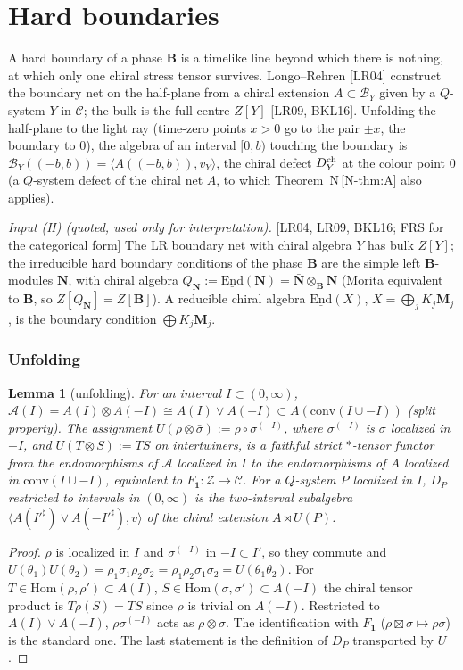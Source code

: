 \documentclass[11pt]{article}
\newtheorem{lemma}[theorem]{Lemma}
\theoremstyle{definition}
\theoremstyle{remark}
\newcommand{\cA}{\mathcal A}
\newcommand{\cB}{\mathcal B}
\newcommand{\bfB}{\mathbf B}
\newcommand{\nref}[1]{N\,\ref{N-#1}}
\begin{document}
\section{Hard boundaries}\label{sec:hard}
A hard boundary of a phase $\bfB$ is a timelike line beyond which there is nothing, at which only one chiral stress tensor survives. Longo--Rehren [LR04] construct the boundary net on the half-plane from a chiral extension $A\subset\cB_Y$ given by a $Q$-system $Y$ in $\mathcal C$; the bulk is the full centre $Z[Y]$ [LR09, BKL16]. Unfolding the half-plane to the light ray (time-zero points $x>0$ go to the pair $\pm x$, the boundary to $0$), the algebra of an interval $[0,b)$ touching the boundary is $\cB_Y((-b,b))=\langle A((-b,b)),v_Y\rangle$, the chiral defect $D^{\rm ch}_Y$ at the colour point $0$ (a $Q$-system defect of the chiral net $A$, to which Theorem~\nref{thm:A} also applies).

\emph{Input (H) (quoted, used only for interpretation).} [LR04, LR09, BKL16; FRS for the categorical form] The LR boundary net with chiral algebra $Y$ has bulk $Z[Y]$; the irreducible hard boundary conditions of the phase $\bfB$ are the simple left $\bfB$-modules $\mathbf N$, with chiral algebra $Q_{\mathbf N}:=\underline{\mathrm{End}}(\mathbf N)=\bar{\mathbf N}\otimes_{\bfB}\mathbf N$ (Morita equivalent to $\bfB$, so $Z[Q_{\mathbf N}]=Z[\bfB]$). A reducible chiral algebra $\underline{\mathrm{End}}(X)$, $X=\bigoplus_jK_j\mathbf M_j$, is the boundary condition $\bigoplus K_j\mathbf M_j$.

\subsubsection*{Unfolding}
\begin{lemma}[unfolding]\label{lem:unfold}
For an interval $I\subset(0,\infty)$, $\cA(I)=A(I)\otimes A(-I)\cong A(I)\vee A(-I)\subset A(\mathrm{conv}(I\cup-I))$ (split property). The assignment $U(\rho\otimes\bar\sigma):=\rho\circ\sigma^{(-I)}$, where $\sigma^{(-I)}$ is $\sigma$ localized in $-I$, and $U(T\otimes S):=TS$ on intertwiners, is a faithful strict $*$-tensor functor from the endomorphisms of $\cA$ localized in $I$ to the endomorphisms of $A$ localized in $\mathrm{conv}(I\cup-I)$, equivalent to $F_{\mathbf 1}\colon\mathcal Z\to\mathcal C$. For a $Q$-system $P$ localized in $I$, $D_P$ restricted to intervals in $(0,\infty)$ is the two-interval subalgebra $\langle A(I'^\sharp)\vee A(-I'^\sharp),v\rangle$ of the chiral extension $A\rtimes U(P)$.
\end{lemma}
\begin{proof}
$\rho$ is localized in $I$ and $\sigma^{(-I)}$ in $-I\subset I'$, so they commute and $U(\theta_1)U(\theta_2)=\rho_1\sigma_1\rho_2\sigma_2=\rho_1\rho_2\sigma_1\sigma_2=U(\theta_1\theta_2)$. For $T\in\mathrm{Hom}(\rho,\rho')\subset A(I)$, $S\in\mathrm{Hom}(\sigma,\sigma')\subset A(-I)$ the chiral tensor product is $T\rho(S)=TS$ since $\rho$ is trivial on $A(-I)$. Restricted to $A(I)\vee A(-I)$, $\rho\sigma^{(-I)}$ acts as $\rho\otimes\sigma$. The identification with $F_{\mathbf 1}$ ($\rho\boxtimes\sigma\mapsto\rho\sigma$) is the standard one. The last statement is the definition of $D_P$ transported by $U$.
\end{proof}
\end{document}
